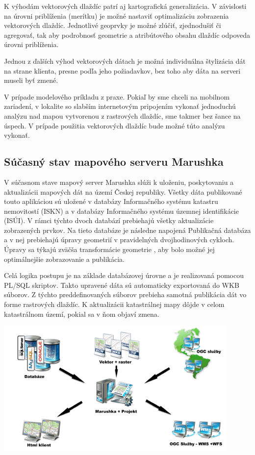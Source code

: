 \documentclass[12pt]{article}
\begin{document}
K výhodám vektorových dlaždíc patrí aj kartografická generalizácia. V závislosti na úrovni priblíženia (merítku) je možné nastaviť optimalizáciu zobrazenia vektorových dlaždíc. Jednotlivé geoprvky je možné zlúčiť, zjednodušiť či agregovať, tak aby podrobnosť geometrie a atribútového obsahu dlaždíc odpoveda úrovni priblíženia.

Jednou z ďalších výhod vektorových dátach je možná individuálna štylizácia dát na strane klienta, presne podľa jeho požiadavkov, bez toho aby dáta na serveri museli byť zmené.

V prípade modelového príkladu z praxe. Pokiaľ by sme chceli na mobilnom zariadení, v lokalite so slabším internetovým pripojením vykonať jednoduchú analýzu nad mapou vytvorenou z rastrových dlaždíc, sme takmer bez šance na úspech. V prípade použitia vektorových dlaždíc bude možné túto analýzu vykonať.

\subsection{Súčasný stav mapového serveru Marushka}

V súčasnom stave mapový server Marushka slúži k uloženiu, poskytovaniu a aktualizácii mapových dát na území Českej republiky. Všetky dáta publikované touto aplikáciou sú uložené v databázy Informačného systému katastru nemovitostí (ISKN) a v databázy Informačného systému územnej identifikácie (ISÚI). V rámci týchto dvoch databází prebiehajú všetky aktualizácie zobrazených prvkov. Na tieto databáze je následne napojená Publikačná databáza a v nej prebiehajú úpravy geometrií v pravidelných dvojhodinových cykloch. Úpravy sa týkajú zväčša transformácie geometrie , aby bolo možné jej optimálnejšie zobrazovanie a publikácia.

Celá logika postupu je na základe databázovej úrovne a je realizovaná pomocou PL/SQL skriptov. Takto upravené dáta sú automaticky exportovaná do WKB súborov. Z týchto preddefinovaných súborov prebieha samotná publikácia dát vo forme rastrových dlaždíc. K aktualizácii katastrálnej mapy dôjde v celom katastrálnom území, pokial sa v ňom objaví zmena.

\begin{center}
   \includegraphics[width=12cm]{./img/Marushka1.png}
\end{center}
\end{document}
